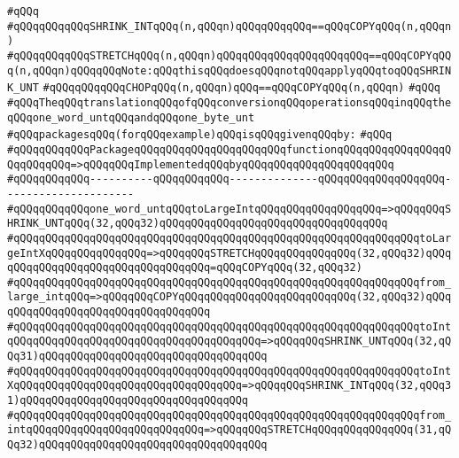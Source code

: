 \verb|#qQQq|\newline
\verb|#qQQqqQQqqQQqSHRINK_INTqQQq(n,qQQqn)qQQqqQQqqQQq==qQQqCOPYqQQq(n,qQQqn)|\newline
\verb|#qQQqqQQqqQQqSTRETCHqQQq(n,qQQqn)qQQqqQQqqQQqqQQqqQQqqQQq==qQQqCOPYqQQq(n,qQQqn)qQQqqQQqNote:qQQqthisqQQqdoesqQQqnotqQQqapplyqQQqtoqQQqSHRINK_UNT|\newline
\verb|#qQQqqQQqqQQqCHOPqQQq(n,qQQqn)qQQq==qQQqCOPYqQQq(n,qQQqn)|\newline
\verb|#qQQq|\newline
\verb|#qQQqTheqQQqtranslationqQQqofqQQqconversionqQQqoperationsqQQqinqQQqtheqQQqone_word_untqQQqandqQQqone_byte_unt|\newline
\verb|#qQQqpackagesqQQq(forqQQqexample)qQQqisqQQqgivenqQQqby:|\newline
\verb|#qQQq|\newline
\verb|#qQQqqQQqqQQqPackageqQQqqQQqqQQqqQQqqQQqqQQqfunctionqQQqqQQqqQQqqQQqqQQqqQQqqQQq=>qQQqqQQqImplementedqQQqbyqQQqqQQqqQQqqQQqqQQqqQQq|\newline
\verb|#qQQqqQQqqQQq----------qQQqqQQqqQQq--------------qQQqqQQqqQQqqQQqqQQq---------------------|\newline
\verb|#qQQqqQQqqQQqone_word_untqQQqtoLargeIntqQQqqQQqqQQqqQQqqQQq=>qQQqqQQqSHRINK_UNTqQQq(32,qQQq32)qQQqqQQqqQQqqQQqqQQqqQQqqQQqqQQqqQQq|\newline
\verb|#qQQqqQQqqQQqqQQqqQQqqQQqqQQqqQQqqQQqqQQqqQQqqQQqqQQqqQQqqQQqqQQqtoLargeIntXqQQqqQQqqQQqqQQq=>qQQqqQQqSTRETCHqQQqqQQqqQQqqQQq(32,qQQq32)qQQqqQQqqQQqqQQqqQQqqQQqqQQqqQQqqQQq=qQQqCOPYqQQq(32,qQQq32)|\newline
\verb|#qQQqqQQqqQQqqQQqqQQqqQQqqQQqqQQqqQQqqQQqqQQqqQQqqQQqqQQqqQQqqQQqfrom_large_intqQQq=>qQQqqQQqCOPYqQQqqQQqqQQqqQQqqQQqqQQqqQQq(32,qQQq32)qQQqqQQqqQQqqQQqqQQqqQQqqQQqqQQqqQQq|\newline
\verb|#qQQqqQQqqQQqqQQqqQQqqQQqqQQqqQQqqQQqqQQqqQQqqQQqqQQqqQQqqQQqqQQqtoIntqQQqqQQqqQQqqQQqqQQqqQQqqQQqqQQqqQQqqQQq=>qQQqqQQqSHRINK_UNTqQQq(32,qQQq31)qQQqqQQqqQQqqQQqqQQqqQQqqQQqqQQqqQQq|\newline
\verb|#qQQqqQQqqQQqqQQqqQQqqQQqqQQqqQQqqQQqqQQqqQQqqQQqqQQqqQQqqQQqqQQqtoIntXqQQqqQQqqQQqqQQqqQQqqQQqqQQqqQQqqQQq=>qQQqqQQqSHRINK_INTqQQq(32,qQQq31)qQQqqQQqqQQqqQQqqQQqqQQqqQQqqQQqqQQq|\newline
\verb|#qQQqqQQqqQQqqQQqqQQqqQQqqQQqqQQqqQQqqQQqqQQqqQQqqQQqqQQqqQQqqQQqfrom_intqQQqqQQqqQQqqQQqqQQqqQQqqQQq=>qQQqqQQqSTRETCHqQQqqQQqqQQqqQQq(31,qQQq32)qQQqqQQqqQQqqQQqqQQqqQQqqQQqqQQqqQQq|\newline
